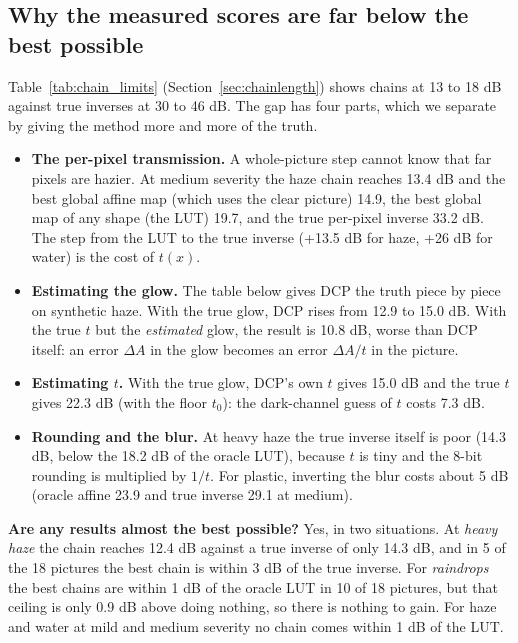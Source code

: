 \documentclass[10pt,a4paper]{article}
\newcommand{\tablein}[1]{}
\newcommand{\SYN}{\textcolor{orange!85!black}{\textbf{[SYNTHETIC]}}}
\begin{document}
\subsection{Why the measured scores are far below the best possible}
Table~\ref{tab:chain_limits} (Section~\ref{sec:chainlength}) shows chains at 13 to 18 dB against true inverses at 30 to 46 dB. The gap has four parts, which we separate by giving the method more and more of the truth.
\begin{itemize}
\item \textbf{The per-pixel transmission.} A whole-picture step cannot know that far pixels are hazier. At medium severity the haze chain reaches 13.4 dB and the best global affine map (which uses the clear picture) 14.9, the best global map of any shape (the LUT) 19.7, and the true per-pixel inverse 33.2 dB. The step from the LUT to the true inverse (+13.5 dB for haze, +26 dB for water) is the cost of $t(x)$.
\item \textbf{Estimating the glow.} The table below gives DCP the truth piece by piece on synthetic haze. With the true glow, DCP rises from 12.9 to 15.0 dB. With the true $t$ but the \emph{estimated} glow, the result is 10.8 dB, worse than DCP itself: an error $\Delta A$ in the glow becomes an error $\Delta A/t$ in the picture.
\item \textbf{Estimating $t$.} With the true glow, DCP's own $t$ gives 15.0 dB and the true $t$ gives 22.3 dB (with the floor $t_0$): the dark-channel guess of $t$ costs 7.3 dB.
\item \textbf{Rounding and the blur.} At heavy haze the true inverse itself is poor (14.3 dB, below the 18.2 dB of the oracle LUT), because $t$ is tiny and the 8-bit rounding is multiplied by $1/t$. For plastic, inverting the blur costs about 5 dB (oracle affine 23.9 and true inverse 29.1 at medium).
\end{itemize}
\begin{table}[H]\centering\scriptsize\resizebox{\textwidth}{!}{\tablein{gap_haze}}\caption{\SYN\ DCP given the truth piece by piece (calibrated synthetic haze, 18 held-out pictures; PSNR in dB).}\end{table}
\textbf{Are any results almost the best possible?} Yes, in two situations. At \emph{heavy haze} the chain reaches 12.4 dB against a true inverse of only 14.3 dB, and in 5 of the 18 pictures the best chain is within 3 dB of the true inverse. For \emph{raindrops} the best chains are within 1 dB of the oracle LUT in 10 of 18 pictures, but that ceiling is only 0.9 dB above doing nothing, so there is nothing to gain. For haze and water at mild and medium severity no chain comes within 1 dB of the LUT.
\end{document}
